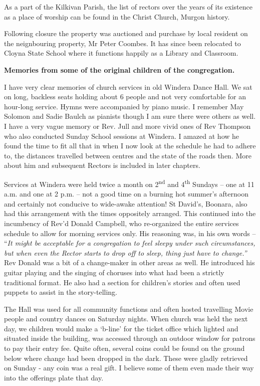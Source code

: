 As a part of the Kilkivan Parish, the list of rectors over the years of its existence as a place of worship can be found in the Christ Church, Murgon history.

Following closure the property was auctioned and purchase by local resident on the neignbouring property, Mr Peter Coombes. It has since been relocated to Cloyna State School where it functions happily as a Library and Classroom.

\textbf{Memories from some of the original children of the congregation.}

I have very clear memories of church services in old Windera Dance Hall. We sat on long, backless seats holding about 6 people and not very comfortable for an hour-long service. Hymns were accompanied by piano music. I remember May Solomon and Sadie Baulch as pianists though I am sure there were others as well. I have a very vague memory or Rev. Jull and more vivid ones of Rev Thompson who also conducted Sunday School sessions at Windera. I amazed at how he found the time to fit all that in when I now look at the schedule he had to adhere to, the distances travelled between centres and the state of the roads then. More about him and subsequent Rectors is included in later chapters.

Services at Windera were held twice a month on 2\textsuperscript{nd} and 4\textsuperscript{th} Sundays -- one at 11 a.m. and one at 2 p.m. -- not a good time on a burning hot summer's afternoon and certainly not conducive to wide-awake attention! St David's, Boonara, also had this arrangement with the times oppositely arranged. This continued into the incumbency of Rev'd Donald Campbell, who re-organized the entire services schedule to allow for morning services only. His reasoning was, in his own words -- ``\emph{It might be acceptable for a congregation to feel sleepy under such circumstances, but when even the Rector starts to drop off to sleep, thing just have to change.''} Rev Donald was a bit of a change-maker in other areas as well. He introduced his guitar playing and the singing of choruses into what had been a strictly traditional format. He also had a section for children's stories and often used puppets to assist in the story-telling.

The Hall was used for all community functions and often hosted travelling Movie people and country dances on Saturday nights. When church was held the next day, we children would make a `b-line' for the ticket office which lighted and situated inside the building, was accessed through an outdoor window for patrons to pay their entry fee. Quite often, several coins could be found on the ground below where change had been dropped in the dark. These were gladly retrieved on Sunday - any coin was a real gift. I believe some of them even made their way into the offerings plate that day.


